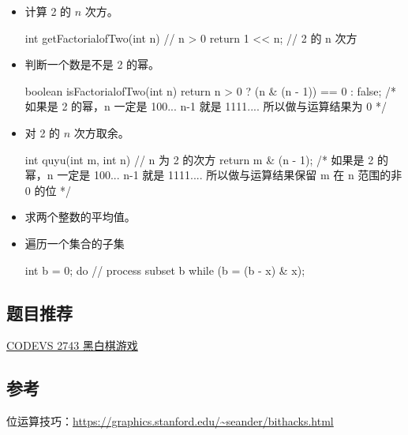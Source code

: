\begin{itemize}
\begin{cppcode}
{  return (x ^ y) >=
         0;  // true 表示 x 和 y 有相同的符号，false 表示 x,y 有相反的符号。
}
\end{cppcode}
\item 计算 2 的 $n$ 次方。
\begin{cppcode}
int getFactorialofTwo(int n) {  // n > 0
  return 1 << n;                // 2 的 n 次方
}
\end{cppcode}
\item 判断一个数是不是 2 的幂。
\begin{cppcode}
boolean isFactorialofTwo(int n) {
  return n > 0 ? (n & (n - 1)) == 0 : false;
  /* 如果是 2 的幂，n 一定是 100... n-1 就是 1111....
     所以做与运算结果为 0 */
}
\end{cppcode}
\item 对 2 的 $n$ 次方取余。
\begin{cppcode}
int quyu(int m, int n) {  // n 为 2 的次方
  return m & (n - 1);
  /* 如果是 2 的幂，n 一定是 100... n-1 就是 1111....
     所以做与运算结果保留 m 在 n 范围的非 0 的位 */
}
\end{cppcode}
\item 求两个整数的平均值。
\begin{cppcode}
int getAverage(int x, int y) {
  return (x + y) >> 1;
  ｝
\end{cppcode}
\item 遍历一个集合的子集
\begin{cppcode}
int b = 0;
do {
  // process subset b
} while (b = (b - x) & x);
\end{cppcode}
\end{itemize}

\subsection{题目推荐}

\href{http://codevs.cn/problem/2743/}{CODEVS 2743 黑白棋游戏}

\subsection{参考}

位运算技巧：\url{https://graphics.stanford.edu/~seander/bithacks.html}
